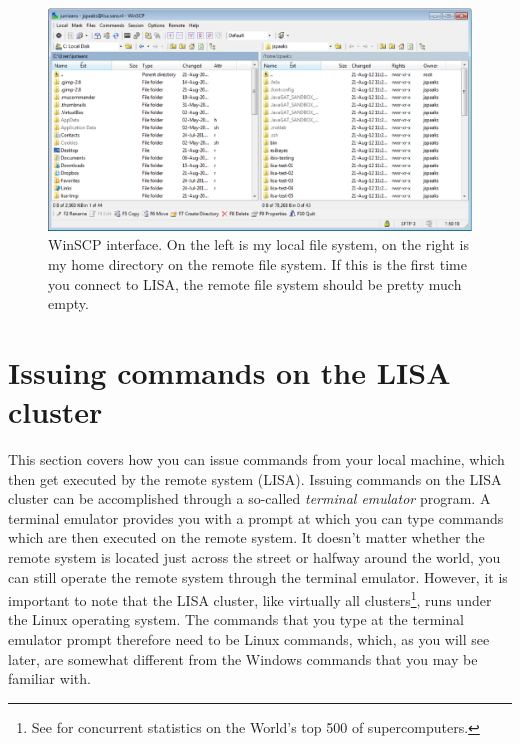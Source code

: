 \begin{figure}[htbp]
  \centering
    \includegraphics[width=1.0\textwidth]{./../eps/winscp-two-panes.eps}
  \caption{WinSCP interface. On the left is my local file system, on the right is my home directory on the remote file system. If this is the first time you connect to LISA, the remote file system should be pretty much empty.}
  \label{fig:winscp-two-panes}
\end{figure}




\section{Issuing commands on the LISA cluster}
This section covers how you can issue commands from your local machine, which then get executed by the remote system (LISA). Issuing commands on the LISA cluster can be accomplished through a so-called \textit{terminal emulator} program. A terminal emulator provides you with a prompt at which you can type commands which are then executed on the remote system. It doesn't matter whether the remote system is located just across the street or halfway around the world, you can still operate the remote system through the terminal emulator. However, it is important to note that the LISA cluster, like virtually all clusters\footnote{See  for concurrent statistics on the World's top 500 of supercomputers.}, runs under the Linux operating system. The commands that you type at the terminal emulator prompt therefore need to be Linux commands, which, as you will see later, are somewhat different from the Windows commands that you may be familiar with.


